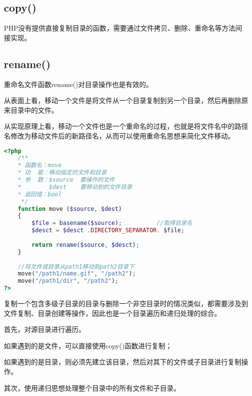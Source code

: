 \subsection{copy()}

PHP没有提供直接复制目录的函数，需要通过文件拷贝、删除、重命名等方法间接实现。

\subsection{rename()}

重命名文件函数rename()对目录操作也是有效的。

从表面上看，移动一个文件是将文件从一个目录复制到另一个目录，然后再删除原来目录中的文件。

从实现原理上看，移动一个文件也是一个重命名的过程，也就是将文件名中的路径名修改为移动文件后的新路径名，从而可以使用重命名思想来简化文件移动。






\begin{lstlisting}[language=PHP]
<?php
	/**
	* 函数名：move
	* 功  能：移动指定的文件和目录
	* 参  数：$source  要操作的文件
	*		 $dest    要移动到的文件目录
	* 返回值：bool
     */
	function move ($source, $dest)
	{
		$file = basename($source);			//取得目录名
		$desct = $desct .DIRECTORY_SEPARATOR. $file;
	
		return rename($source, $desct);
	}
	
	//将文件或目录从path1移动到path2目录下
	move("/path1/name.gif", "/path2");
	move("/path1/dir", "/path2");
?>
\end{lstlisting}


复制一个包含多级子目录的目录与删除一个非空目录时的情况类似，都需要涉及到文件复制、目录创建等操作，因此也是一个目录遍历和递归处理的综合。

首先，对源目录进行遍历。

\begin{compactitem}
\item 如果遇到的是文件，可以直接使用copy()函数进行复制；
\item 如果遇到的是目录，则必须先建立该目录，然后对其下的文件或子目录进行复制操作。
\end{compactitem}

其次，使用递归思想处理整个目录中的所有文件和子目录。



